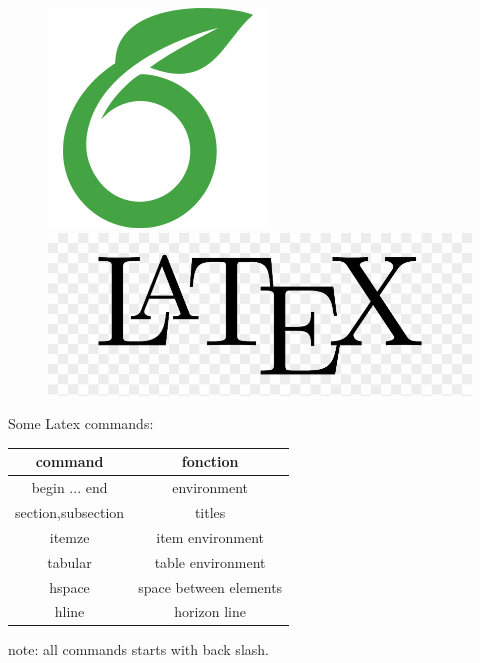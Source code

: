 \documentclass[a4paper,11pt]{report}
\begin{document}
\begin{figure}[!h]
    \centering
    \includegraphics[scale=0.2]{img16.png}
    \hfill
    \includegraphics[scale=0.15]{img17.png}
\end{figure}
Some Latex commands:\\
\begin{centering}
\begin{tabular}{|c|c|}

\hline
    command & fonction \\
\hline
  begin ... end& environment\\
\hline
section,subsection&titles\\
\hline
itemze &item environment\\
\hline
tabular&table environment\\
\hline
hspace&space between elements\\
\hline
hline&horizon line\\
\hline



\end{tabular}

\end{centering}
note: all commands starts with back slash.

\clearpage

\end{document}
